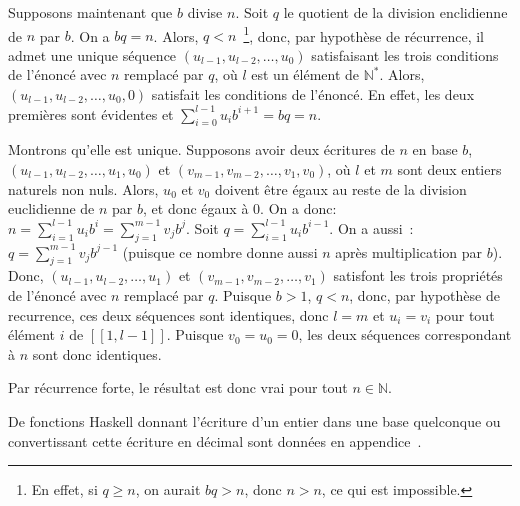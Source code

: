 Supposons maintenant que $b$ divise $n$. 
Soit $q$ le quotient de la division enclidienne de $n$ par $b$. 
On a $b q = n$.
Alors, $q < n$~\footnote{En effet, si $q \geq n$, on aurait $b q > n$, donc $n > n$, ce qui est impossible.}, donc, par hypothèse de récurrence, il admet une unique séquence $(u_{l-1}, u_{l-2}, \dots, u_0)$ satisfaisant les trois conditions de l'énoncé avec $n$ remplacé par $q$, où $l$ est un élément de $\mathbb{N}^*$. 
Alors, $(u_{l-1}, u_{l-2}, \dots, u_0, 0)$ satisfait les conditions de l'énoncé. 
En effet, les deux premières sont évidentes et $\sum_{i=0}^{l-1} u_i b^{i+1} = b q = n$. 

Montrons qu'elle est unique. 
Supposons avoir deux écritures de $n$ en base $b$, $(u_{l-1}, u_{l-2}, \dots, u_1, u_0)$ et $(v_{m-1}, v_{m-2}, \dots, v_1, v_0)$, où $l$ et $m$ sont deux entiers naturels non nuls. 
Alors, $u_0$ et $v_0$ doivent être égaux au reste de la division euclidienne de $n$ par $b$, et donc égaux à $0$. 
On a donc: $n = \sum_{i=1}^{l-1} u_i b^{i} = \sum_{j=1}^{m-1} v_j b^{j}$. 
Soit $q = \sum_{i=1}^{l-1} u_i b^{i-1}$. 
On a aussi : $q = \sum_{j=1}^{m-1} v_j b^{j-1}$ (puisque ce nombre donne aussi $n$ après multiplication par $b$).  
Donc, $(u_{l-1}, u_{l-2}, \dots, u_1)$ et $(v_{m-1}, v_{m-2}, \dots, v_1)$ satisfont les trois propriétés de l'énoncé avec $n$ remplacé par $q$. 
Puisque $b > 1$, $q < n$, donc, par hypothèse de recurrence, ces deux séquences sont identiques, donc $l = m$ et $u_i = v_i$ pour tout élément $i$ de $[\![1, l-1]\!]$. 
Puisque $v_0 = u_0 = 0$, les deux séquences correspondant à $n$ sont donc identiques. 

Par récurrence forte, le résultat est donc vrai pour tout $n \in \mathbb{N}$.

\done

\bigskip

De fonctions Haskell donnant l'écriture d'un entier dans une base quelconque ou convertissant cette écriture en décimal sont données en appendice~\label{app:Haskell_baseb}.

